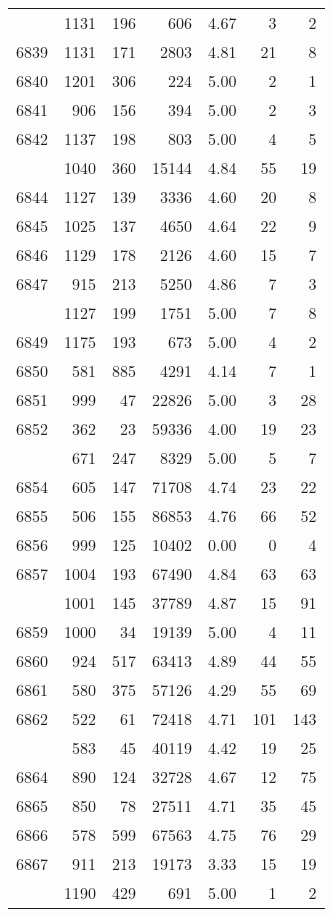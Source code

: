 \documentclass[
]{article}
\begin{document}
\begin{table}
\begin{tabular}[t]{lrrrrrr}
\addlinespace
6838 & 1131 & 196 & 606 & 4.67 & 3 & 2\\
6839 & 1131 & 171 & 2803 & 4.81 & 21 & 8\\
6840 & 1201 & 306 & 224 & 5.00 & 2 & 1\\
6841 & 906 & 156 & 394 & 5.00 & 2 & 3\\
6842 & 1137 & 198 & 803 & 5.00 & 4 & 5\\
\addlinespace
6843 & 1040 & 360 & 15144 & 4.84 & 55 & 19\\
6844 & 1127 & 139 & 3336 & 4.60 & 20 & 8\\
6845 & 1025 & 137 & 4650 & 4.64 & 22 & 9\\
6846 & 1129 & 178 & 2126 & 4.60 & 15 & 7\\
6847 & 915 & 213 & 5250 & 4.86 & 7 & 3\\
\addlinespace
6848 & 1127 & 199 & 1751 & 5.00 & 7 & 8\\
6849 & 1175 & 193 & 673 & 5.00 & 4 & 2\\
6850 & 581 & 885 & 4291 & 4.14 & 7 & 1\\
6851 & 999 & 47 & 22826 & 5.00 & 3 & 28\\
6852 & 362 & 23 & 59336 & 4.00 & 19 & 23\\
\addlinespace
6853 & 671 & 247 & 8329 & 5.00 & 5 & 7\\
6854 & 605 & 147 & 71708 & 4.74 & 23 & 22\\
6855 & 506 & 155 & 86853 & 4.76 & 66 & 52\\
6856 & 999 & 125 & 10402 & 0.00 & 0 & 4\\
6857 & 1004 & 193 & 67490 & 4.84 & 63 & 63\\
\addlinespace
6858 & 1001 & 145 & 37789 & 4.87 & 15 & 91\\
6859 & 1000 & 34 & 19139 & 5.00 & 4 & 11\\
6860 & 924 & 517 & 63413 & 4.89 & 44 & 55\\
6861 & 580 & 375 & 57126 & 4.29 & 55 & 69\\
6862 & 522 & 61 & 72418 & 4.71 & 101 & 143\\
\addlinespace
6863 & 583 & 45 & 40119 & 4.42 & 19 & 25\\
6864 & 890 & 124 & 32728 & 4.67 & 12 & 75\\
6865 & 850 & 78 & 27511 & 4.71 & 35 & 45\\
6866 & 578 & 599 & 67563 & 4.75 & 76 & 29\\
6867 & 911 & 213 & 19173 & 3.33 & 15 & 19\\
\addlinespace
6868 & 1190 & 429 & 691 & 5.00 & 1 & 2\\

\end{tabular}
\end{table}
\end{document}
